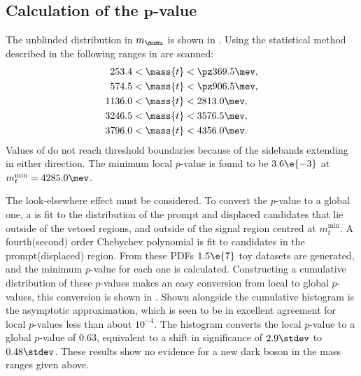 \subsection[Calculation of the $p$-value]
{Calculation of the $\boldsymbol{p}$-value}

The unblinded distribution in $m_{\mumu}$ is shown in .
Using the statistical method described in  the following ranges in 
are scanned:
\begin{align*}
  253.4 &< \mass{t} < \pz369.5 \mev, \\
  574.5 &< \mass{t} < \pz906.5 \mev, \\
  1136.0 &< \mass{t} < 2813.0 \mev, \\
  3246.5 &< \mass{t} < 3576.5 \mev, \\
  3796.0 &< \mass{t} < 4356.0 \mev.
\end{align*}
Values of  do not reach threshold boundaries because of the sidebands extending in either
direction.
The minimum local $p$-value is found to be $3.6\e{-3}$ at $m_{t}^\mathrm{min} = 4285.0\mev$.

The look-elsewhere effect must be considered.
To convert the $p$-value to a global one, a \PDF is fit to the \mass{\mumu} distribution of the
prompt and displaced \btokstrdb candidates that lie outside of the vetoed regions, and outside of
the signal region centred at $m_t^\mathrm{min}$.
A fourth(second) order Chebychev polynomial is fit to candidates in the prompt(displaced) region.
From these \glspl{PDF} $1.5\e{7}$ toy datasets are generated, and the minimum $p$-value for each
one is calculated.
Constructing a cumulative distribution of these $p$-values makes an easy conversion from local to
global $p$-values, this conversion is shown in .
Shown alongside the cumulative histogram is the asymptotic approximation, which is seen to be in
excellent agreement for local $p$-values less than about $10^{-4}$.
The histogram converts the local $p$-value to a global $p$-value of $0.63$, equivalent to a shift
in significance of $2.9\stdev$ to $0.48\stdev$.
These results show no evidence for a new dark boson in the mass ranges given above.

